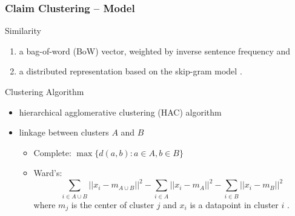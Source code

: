 \documentclass{beamer}
\begin{document}
\begin{frame}
	\frametitle{Claim Clustering -- Model}
	Similarity
\begin{enumerate} 
\item a bag-of-word (BoW) vector, weighted
by inverse sentence frequency \cite{ramage2009random} and 
\item a distributed representation based on the skip-gram model
	\cite{mikolov2013distributed}. 
\end{enumerate}
\vspace{0.5cm}
Clustering Algorithm
\begin{itemize}
	\item hierarchical agglomerative clustering (HAC) algorithm \cite{szekely2005hierarchical}
	\item linkage between clusters $A$ and $B$
		\begin{itemize}
			\item Complete: $\max \{d(a, b): a \in A, b \in B\}$
			\item Ward's:
		$$
		\sum_{i \in A \cup B} ||x_i - m_{A \cup B}||^2 - \sum_{i \in A}||x_i - m_A||^2 
		- \sum_{i \in B} ||x_i - m_B||^2
		$$ 
		where $m_j$ is the center of cluster $j$  and $x_i$ is a datapoint
		in cluster $i$ \cite{ward1963hierarchical}.
		\end{itemize}
\end{itemize}
\end{frame}

\end{document}
